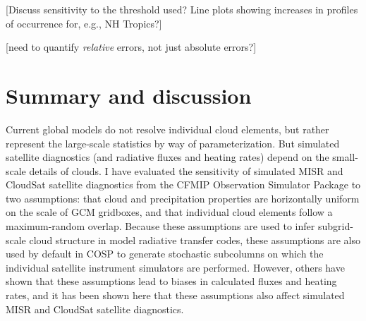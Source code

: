 [Discuss sensitivity to the threshold used? Line plots showing increases in profiles of occurrence for, e.g., NH Tropics?]

[need to quantify \emph{relative} errors, not just absolute errors?]

\section{Summary and discussion} Current global models do not resolve individual cloud elements, but rather represent the large-scale statistics by way of parameterization. But simulated satellite diagnostics (and radiative fluxes and heating rates) depend on the small-scale details of clouds. I have evaluated the sensitivity of simulated MISR and CloudSat satellite diagnostics from the CFMIP Observation Simulator Package to two assumptions: that cloud and precipitation properties are horizontally uniform on the scale of GCM gridboxes, and that individual cloud elements follow a maximum-random overlap. Because these assumptions are used to infer subgrid-scale cloud structure in model radiative transfer codes, these assumptions are also used by default in COSP to generate stochastic subcolumns on which the individual satellite instrument simulators are performed. However, others have shown that these assumptions lead to biases in calculated fluxes and heating rates, and it has been shown here that these assumptions also affect simulated MISR and CloudSat satellite diagnostics.  

